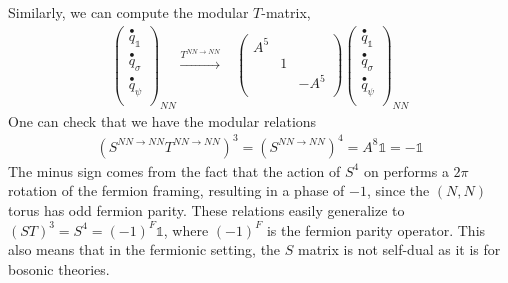 \documentclass[12pt,a4paper]{article}
\newcounter{arrow}
\newcommand{\ra}{\rightarrow}
\newcommand{\unit}{\mathds{1}}
\begin{document}
Similarly, we can compute the modular $T$-matrix, 
\begin{align}
\left( \begin{matrix}
\overset{\bullet}{q}_\unit\\
\overset{\bullet}{q}_\sigma\\
\overset{\bullet}{q}_\psi\\
\end{matrix} \right)_{NN} 
\xrightarrow{T^{NN \rightarrow NN}} &\left( \begin{matrix}
A^5& &\\
&1&\\
&&-A^5\\
\end{matrix} \right)
\left( \begin{matrix}
\overset{\bullet}{q}_\unit\\
\overset{\bullet}{q}_\sigma\\
\overset{\bullet}{q}_\psi\\
\end{matrix} \right)_{NN}
\end{align}
One can check that we have the modular relations
\begin{align}
 (S^{NN\ra NN}T^{NN\ra NN})^3 = (S^{NN \ra NN})^4= A^{8}\unit = -\unit
 \end{align}
The minus sign comes from the fact that the action of $S^4$ on performs a $2\pi$ rotation 
of the fermion framing, resulting in a phase of $-1$, since the $(N,N)$ torus has odd fermion parity. 
These relations easily generalize to $(ST)^3=S^4=(-1)^F\unit$, where $(-1)^F$ is the fermion 
parity operator. 
This also means that in the fermionic setting, 
the $S$ matrix is not self-dual as it is for bosonic theories.


\medskip
\end{document}
